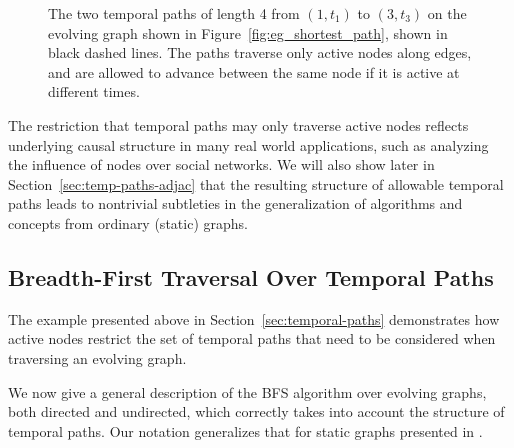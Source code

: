 \documentclass[10pt,conference,compsocconf]{IEEEtran}
\theoremstyle{definition}
\begin{document}
\begin{figure}[h]
\begin{center}
\end{center}
\caption{The two temporal paths of length 4 from $(1, t_1)$ to $(3,t_3)$ on the evolving graph
shown in Figure~\ref{fig:eg_shortest_path}, shown in black dashed lines.
The paths traverse only active nodes along edges, and are allowed to advance
between the same node if it is active at different times.}
\label{fig:active}
\end{figure}

The restriction that temporal paths may only traverse active nodes reflects
underlying causal structure in many real world applications, such as analyzing the
influence of nodes over social networks. We will also show later in
Section~\ref{sec:temp-paths-adjac}
that the resulting structure of allowable temporal paths leads to nontrivial
subtleties in the generalization of algorithms and concepts from ordinary
(static) graphs.



\subsection{Breadth-First Traversal Over Temporal Paths}
\label{sec:evolving-graph-bfs}

The example presented above in Section~\ref{sec:temporal-paths}
demonstrates how active nodes restrict the set of temporal paths
that need to be considered when traversing an evolving graph.

We now give a general description of the BFS algorithm over evolving graphs,
both directed and undirected, which correctly takes into account the structure
of temporal paths.
Our notation generalizes that for static graphs presented in \cite{even12,kegi11}.
\end{document}
